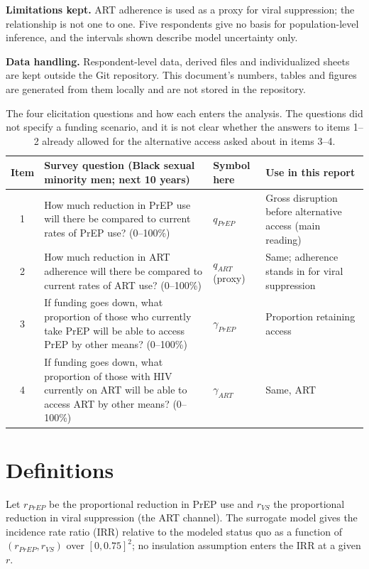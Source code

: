 \documentclass[10pt,a4paper]{article}
\begin{document}
\textbf{Limitations kept.} ART adherence is used as a proxy for viral suppression; the relationship is not one to one. Five respondents give no basis for population-level inference, and the intervals shown describe model uncertainty only.

\textbf{Data handling.} Respondent-level data, derived files and individualized sheets are kept outside the Git repository. This document's numbers, tables and figures are generated from them locally and are not stored in the repository.

\begin{table}[htbp]\centering\small
\begin{tabular}{@{}c>{\raggedright\arraybackslash}p{6.4cm}>{\raggedright\arraybackslash}p{2.3cm}>{\raggedright\arraybackslash}p{4.4cm}@{}}\toprule
Item & Survey question (Black sexual minority men; next 10 years) & Symbol here & Use in this report\\\midrule
1 & How much reduction in PrEP use will there be compared to current rates of PrEP use? (0--100\%) & $q_{PrEP}$ & Gross disruption before alternative access (main reading)\\
2 & How much reduction in ART adherence will there be compared to current rates of ART use? (0--100\%) & $q_{ART}$ (proxy) & Same; adherence stands in for viral suppression\\
3 & If funding goes down, what proportion of those who currently take PrEP will be able to access PrEP by other means? (0--100\%) & $\gamma_{PrEP}$ & Proportion retaining access\\
4 & If funding goes down, what proportion of those with HIV currently on ART will be able to access ART by other means? (0--100\%) & $\gamma_{ART}$ & Same, ART\\\bottomrule
\end{tabular}
\caption{The four elicitation questions and how each enters the analysis. The questions did not specify a funding scenario, and it is not clear whether the answers to items 1--2 already allowed for the alternative access asked about in items 3--4.}\label{tab:survey}
\end{table}

\section{Definitions}
Let $r_{PrEP}$ be the proportional reduction in PrEP use and $r_{VS}$ the proportional reduction in viral suppression (the ART channel). The surrogate model gives the incidence rate ratio (IRR) relative to the modeled status quo as a function of $(r_{PrEP},r_{VS})$ over $[0,0.75]^2$; no insulation assumption enters the IRR at a given $r$.
\end{document}
